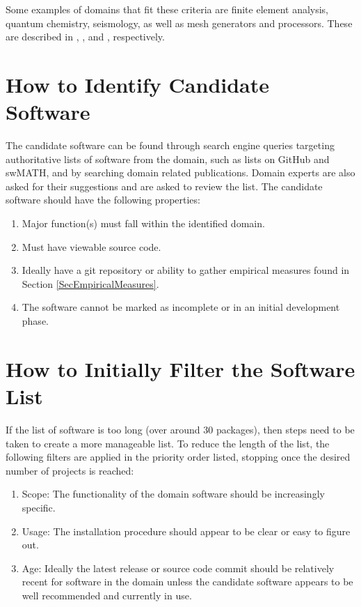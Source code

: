 \documentclass[letterpaper,cleveref]{lipics-v2019}
\theoremstyle{definition}
\begin{document}
Some examples of domains that fit these criteria are finite element analysis, quantum chemistry, seismology, as well as mesh generators and processors. These are described in \citep{szabo1996finite}, \citep{veryazov20042molcas}, \citep{SmithEtAl2018} and \citep{smith2016state}, respectively.

\section{How to Identify Candidate Software} \label{SecIdentifyCandSoft}
The candidate software can be found through search engine queries targeting authoritative lists of software from the domain, such as lists on GitHub and swMATH, and by searching domain related publications. Domain experts are also asked for their suggestions and are asked to review the list. The candidate software should have the following properties:

\begin{enumerate}
	\item Major function(s) must fall within the identified domain.
	\item Must have viewable source code.
	\item Ideally have a git repository or ability to gather empirical measures found in Section \ref{SecEmpiricalMeasures}.
	\item The software cannot be marked as incomplete or in an initial development phase.
\end{enumerate}

\section{How to Initially Filter the Software List} \label{SecInitialFilter}
If the list of software is too long (over around 30 packages), then steps need to be taken to create a more manageable list. To reduce the length of the list, the following filters are applied in the priority order listed, stopping once the desired number of projects is reached:

\begin{enumerate}
	\item Scope: The functionality of the domain software should be increasingly specific.
	\item Usage: The installation procedure should appear to be clear or easy to figure out.
    \item Age: Ideally the latest release or source code commit should be relatively recent for software in the domain unless the candidate software appears to be well recommended and currently in use.
\end{enumerate}
\end{document}
